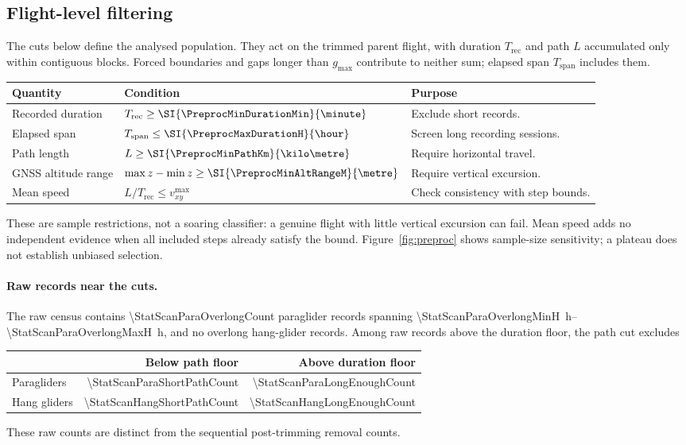 \subsection{Flight-level filtering}
\label{sec:flightfilter}
\begin{revblock}
The cuts below define the analysed population. They act on the trimmed parent
flight, with duration $T_{\mathrm{rec}}$ and path $L$ accumulated only within
contiguous blocks. Forced boundaries and gaps longer than $g_{\max}$ contribute
to neither sum; elapsed span $T_{\mathrm{span}}$ includes them.
\begin{center}
\begin{tabularx}{\linewidth}{@{}l l X@{}}
\toprule
\textbf{Quantity} & \textbf{Condition} & \textbf{Purpose} \\
\midrule
Recorded duration & $T_{\mathrm{rec}}\ge\SI{\PreprocMinDurationMin}{\minute}$ & Exclude short records. \\
Elapsed span & $T_{\mathrm{span}}\le\SI{\PreprocMaxDurationH}{\hour}$ & Screen long recording sessions. \\
Path length & $L\ge\SI{\PreprocMinPathKm}{\kilo\metre}$ & Require horizontal travel. \\
GNSS altitude range & $\max z-\min z\ge\SI{\PreprocMinAltRangeM}{\metre}$ & Require vertical excursion. \\
Mean speed & $L/T_{\mathrm{rec}}\le v_{xy}^{\max}$ & Check consistency with step bounds. \\
\bottomrule
\end{tabularx}
\end{center}
These are sample restrictions, not a soaring classifier: a genuine flight with
little vertical excursion can fail. Mean speed adds no independent evidence when
all included steps already satisfy the bound. Figure~\ref{fig:preproc} shows
sample-size sensitivity; a plateau does not establish unbiased selection.

\paragraph{Raw records near the cuts.}
The raw census contains \num{\StatScanParaOverlongCount} paraglider records spanning
\SIrange{\StatScanParaOverlongMinH}{\StatScanParaOverlongMaxH}{\hour},
and no overlong hang-glider records. Among raw records above the duration floor,
the path cut excludes
\begin{center}
\begin{tabular}{@{}lrr@{}}
\toprule
 & \textbf{Below path floor} & \textbf{Above duration floor} \\
\midrule
Paragliders & \num{\StatScanParaShortPathCount} & \num{\StatScanParaLongEnoughCount} \\
Hang gliders & \num{\StatScanHangShortPathCount} & \num{\StatScanHangLongEnoughCount} \\
\bottomrule
\end{tabular}
\end{center}
These raw counts are distinct from the sequential post-trimming removal counts.


\end{revblock}
